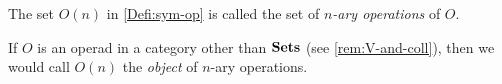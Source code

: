 \begin{rem}
  \end{rem}

\begin{term}\label{term:nary-ops}
The set $O(n)$ in \cref{Defi:sym-op} is called the set of \emph{$n$-ary operations} of $O$.
\end{term}

\begin{rem}\label{rem:nary-ops-V}
If $O$ is an operad in a category other than $\mathbf{Sets}$ (see \cref{rem:V-and-coll}), then we would call $O(n)$ the \emph{object} of $n$-ary operations.
\end{rem}

%

